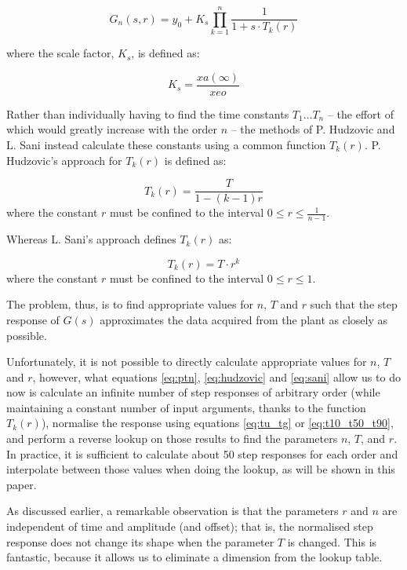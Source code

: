 \begin{equation}
    G_n(s,r) = y_0 + K_s \prod_{k=1}^{n} \frac{1}{1+s \cdot T_k(r)}
    \label{eq:ptn}
\end{equation}

where the scale factor, $K_s$, is defined as:

\begin{equation}
    K_s = \frac{xa(\infty)}{xeo}
\end{equation}

Rather than individually having to find the time constants  $T_1\ldots  T_n$  --
the effort of which would greatly increase with the order $n$ -- the methods  of
P.  Hudzovic  and  L.  Sani  instead  calculate  these constants using a  common
function  $T_k(r)$.  P.  Hudzovic's  approach\cite{ref:hudzovic} for $T_k(r)$ is
defined as:

\begin{equation}
    T_k(r) = \frac{T}{1 - (k-1)r}
    \label{eq:hudzovic}
\end{equation}
where  the  constant  $r$ must be  confined  to  the  interval  $0  \le  r  \leq
\frac{1}{n-1}$.

Whereas L. Sani's approach\cite{ref:sani} defines $T_k(r)$ as:

\begin{equation}
    T_k(r) = T \cdot r^k
    \label{eq:sani}
\end{equation}
where the constant $r$ must be confined to the interval $0 \leq r \le 1$.

The problem, thus, is to find appropriate  values for $n$, $T$ and $r$ such that
the step  response  of  $G(s)$  approximates the data acquired from the plant as
closely   as   possible.

Unfortunately,  it is not possible to directly calculate appropriate values  for
$n$, $T$ and $r$, however,  what  equations  \ref{eq:ptn}, \ref{eq:hudzovic} and
\ref{eq:sani}  allow  us  to do now is calculate  an  infinite  number  of  step
responses of arbitrary  order  (while  maintaining  a  constant  number of input
arguments,  thanks  to  the  function  $T_k(r)$), normalise the  response  using
equations \ref{eq:tu_tg}  or  \ref{eq:t10_t50_t90}, and perform a reverse lookup
on those  results  to  find the parameters $n$, $T$, and $r$. In practice, it is
sufficient to calculate about 50 step responses for each order  and  interpolate
between those values  when  doing  the  lookup,  as will be shown in this paper.

As discussed earlier, a remarkable  observation  is  that the parameters $r$ and
$n$ are independent of time and amplitude (and offset); that is,  the normalised
step response does not change its  shape when the parameter $T$ is changed. This
is fantastic,  because  it  allows  us  to eliminate a dimension from the lookup
table.

